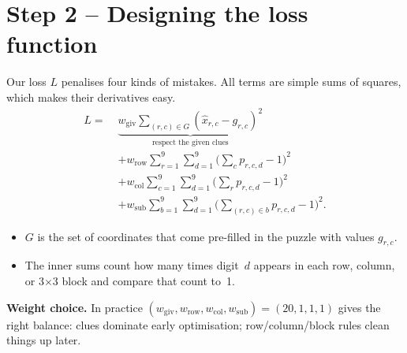 \documentclass[12pt]{article}
\begin{document}
\section{Step 2 -- Designing the loss function}

Our loss $L$ penalises four kinds of mistakes. All terms are simple sums of squares,
which makes their derivatives easy.
\begin{align*}
    L = \;&\underbrace{w_{\text{giv}}\sum_{(r,c)\in G}(\hat x_{r,c}-g_{r,c})^{2}}_{\text{respect the given clues}} \\
    &+ w_{\text{row}}\sum_{r=1}^{9}\sum_{d=1}^{9}\bigl(\textstyle\sum_c p_{r,c,d}-1\bigr)^{2} \\
    &+ w_{\text{col}}\sum_{c=1}^{9}\sum_{d=1}^{9}\bigl(\textstyle\sum_r p_{r,c,d}-1\bigr)^{2} \\
    &+ w_{\text{sub}}\sum_{b=1}^{9}\sum_{d=1}^{9}\bigl(\textstyle\sum_{(r,c)\in b} p_{r,c,d}-1\bigr)^{2}.
\end{align*}

\begin{itemize}
    \item $G$ is the set of coordinates that come pre-filled in the puzzle with values $g_{r,c}$.
    \item The inner sums count how many times digit~$d$ appears in each row, column, or
          3$\times$3 block and compare that count to~1.
\end{itemize}

\medskip
\noindent\textbf{Weight choice.} In practice $(w_{\text{giv}}, w_{\text{row}}, w_{\text{col}}, w_{\text{sub}}) = (20, 1, 1, 1)$ gives the right balance: 
clues dominate early optimisation; row/column/block rules clean things up later.
\end{document}
